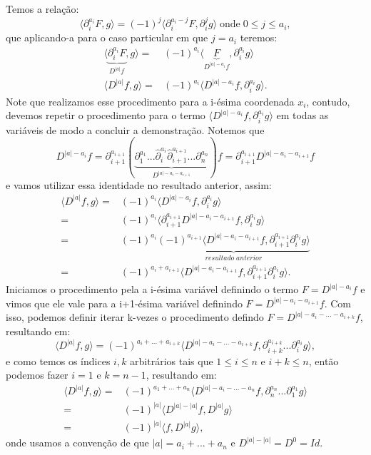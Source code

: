 \documentclass{article}
\begin{document}
\begin{enumerate}
		Temos a relação:
		$$
		\langle \partial^{a_{i}}_{i}F, g \rangle = (-1)^{j}\langle \partial^{a_{i}-j}_{i}F, \partial^{j}_{i}g \rangle \; \text{onde} \; 0 \leq j \leq a_{i},
		$$
		que aplicando-a para o caso particular em que $j = a_{i}$ teremos: 
		$$
		\begin{aligned}
		\langle \underbrace{ \partial^{a_{i}}_{i}F }_{D^{|a|}f}, g \rangle = & (-1)^{a_{i}}\langle \underbrace{F}_{D^{|a|-a_{i}}f}, \partial^{a_{i}}_{i}g \rangle
		\\
		\langle D^{|a|}f, g \rangle = & (-1)^{a_{i}}\langle  D^{|a|-a_{i}}f, \partial^{a_{i}}_{i}g \rangle.
		\end{aligned}
		$$
		Note que realizamos esse procedimento para a i-ésima coordenada $x_{i}$, contudo, devemos repetir o procedimento para o termo  $\langle  D^{|a|-a_{i}}f, \partial^{a_{i}}_{i}g \rangle$ em todas as variáveis de modo a concluir a demonstração. Notemos que 
		$$
		D^{|a|-a_{i}}f = \partial^{a_{i+1}}_{i+1}(\underbrace{ \partial^{a_{1}}_{1}...\hat{\partial}^{a_{i}}_{i}\hat{\partial}^{a_{i+1}}_{i+1}...\partial^{a_{n}}_{n} }_{D^{|a|-a_{i}-a_{i+1}} } )f = \partial^{a_{i+1}}_{i+1}	D^{|a|-a_{i}-a_{i+1}}f
		$$
		e vamos utilizar essa identidade no resultado anterior, assim: 
		$$
		\begin{aligned}
		\langle D^{|a|}f, g \rangle = & (-1)^{a_{i}}\langle  D^{|a|-a_{i}}f, \partial^{a_{i}}_{i}g \rangle
		\\
		= & (-1)^{a_{i}}\langle \partial^{a_{i+1}}_{i+1} D^{|a|-a_{i}-a_{i+1}}f, \partial^{a_{i}}_{i}g \rangle
		\\
		= & (-1)^{a_{i}} \underbrace{ (-1)^{a_{i+1}}\langle D^{|a|-a_{i}-a_{i+1}}f, \partial^{a_{i+1}}_{i+1}\partial^{a_{i}}_{i}g \rangle }_{resultado \; anterior}
		\\
		= & (-1)^{a_{i}+a_{i+1}}\langle D^{|a|-a_{i}-a_{i+1}}f, \partial^{a_{i+1}}_{i+1}\partial^{a_{i}}_{i}g \rangle.
		\end{aligned}
		$$
		Iniciamos o procedimento pela a i-ésima variável definindo o termo $F = D^{|a|- a_{i}}f$ e vimos que ele vale para a i+1-ésima variável definindo $F = D^{|a|- a_{i} - a_{i+1}} f$. Com isso, podemos definir iterar k-vezes o procedimento defindo $F = D^{|a|- a_{i} - ... -a_{i+k}}f$, resultando em:
		$$
		\langle D^{|a|}f, g \rangle = (-1)^{a_{i}+...+a_{i+k}}\langle D^{|a|-a_{i}-...-a_{i+k}}f, \partial^{a_{i+k}}_{i+k}...\partial^{a_{i}}_{i}g \rangle,
		$$
		e como temos os índices $i,k$ arbitrários tais que $1\leq i  \leq n$ e $i+k \leq n$, então podemos fazer $i=1$ e $k=n-1$, resultando em:
		$$
		\begin{aligned}
		\langle D^{|a|}f, g \rangle = & (-1)^{a_{1}+...+a_{n}}\langle D^{|a|-a_{i}-...-a_{n}}f, \partial^{a_{n}}_{n}...\partial^{a_{1}}_{1}g \rangle
		\\
		= & (-1)^{|a|}\langle D^{|a|-|a|}f, D^{|a|}g \rangle
		\\
		= & (-1)^{|a|}\langle f, D^{|a|}g \rangle,
		\end{aligned}
		$$
		onde usamos a convenção de que $|a| = a_{i}+...+a_{n}$ e  $D^{|a|-|a|} = D^{0} = Id$.
			

\end{enumerate}
\end{document}
